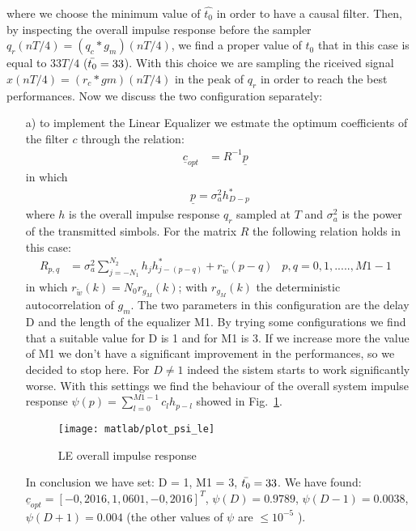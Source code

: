\documentclass[a4paper,oneside]{article}
\renewcommand{\vec}[1]{\underline{#1}}
\begin{document}
{\color{red}where we choose the minimum value of $\hat{t_0}$} in order to have a causal filter. 
Then, by inspecting the overall impulse response before the sampler $q_r(n T/4) = (q_c * g_m)(n T/4)$, we find a proper value of $t_0$ that in this case is equal to $33T/4$ ($\Bar{t_0} = 33$). With this choice we are sampling the riceived signal $x(nT/4) = (r_c*gm)(nT/4)$ in the peak of $q_r$ {\color{red} in order to reach the best performances}.
Now we discuss the two configuration separately:
\begin{itemize}
\item[a)] to implement the Linear Equalizer we estmate the optimum coefficients of the filter $c$ through the relation:
\begin{align}
\vec{c}_{opt}& = R^{-1} \vec{p}& 
\end{align} 
in which 
\begin{align}
&\vec{p} = \sigma_a^2 h_{D-p}^*&	
\end{align}
where $h$ is the overall impulse response $q_r$ sampled at $T$ and $\sigma_a^2$ is the power of the transmitted simbols. For the matrix $R$ the following relation holds in this case:
\begin{align}
 R_{p,q} &= \sigma^2_a \sum_{j=-N_1}^{N_2}h_jh^*_{j-(p-q)} + r_{\tilde{w}}(p-q) & p,q = 0,1,.....,M1-1&
\end{align}
in which $r_{\tilde{w}}(k) = N_0 r_{g_M}(k)$; with $r_{g_M}(k)$ the deterministic autocorrelation of $g_m$.
The two parameters in this configuration are the delay D and the length of the  equalizer M1. By trying some configurations we find that a suitable value for D is 1 and for M1 is 3. If we increase more the value of M1 we don't have a significant improvement in the performances, so we decided to stop here. {\color{red} For $D\neq 1$ indeed the sistem starts to work significantly worse}. With this settings we find the behaviour of the overall system impulse response $\psi(p) = \sum_{l=0}^{M1-1} c_l h_{p-l}$ showed in Fig.~\ref{plot:psi_le}. 

\begin{figure}[h]
  \centering
  \texttt{[image: matlab/plot\_psi\_le]}
  \caption{LE overall impulse response}
  \label{plot:psi_le}
\end{figure}

\newpage In conclusion we have set: D = 1, M1 = 3, $\Bar{t_0} = 33$. 
\newline We have found: $\vec{c}_{opt} = [-0,2016, 1,0601, -0,2016]^T$,{\color{red} $\psi(D) = 0.9789$, $\psi(D-1) = 0.0038$, $\psi(D+1) = 0.004$ (the other values of $\psi$ are $\leq 10^{-5}$ ).}


\end{itemize}
\end{document}
